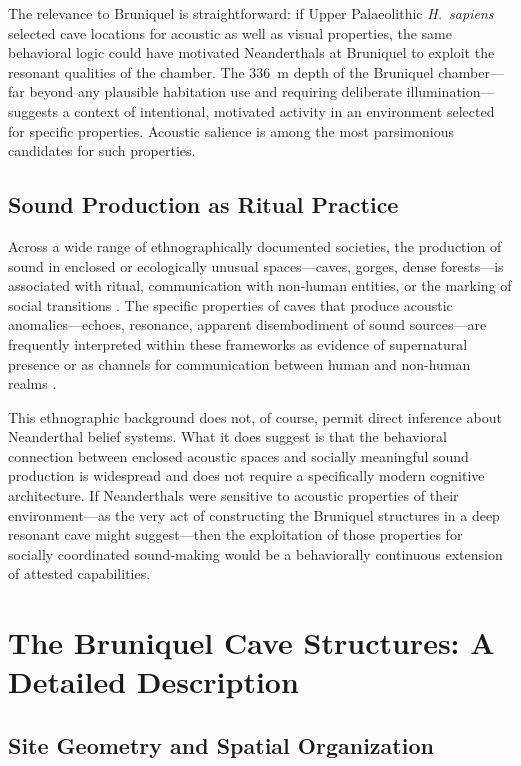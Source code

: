 \documentclass[12pt]{article}
\begin{document}
The relevance to Bruniquel is straightforward: if Upper Palaeolithic \textit{H.\ sapiens} selected cave locations for acoustic as well as visual properties, the same behavioral logic could have motivated Neanderthals at Bruniquel to exploit the resonant qualities of the chamber. The 336~m depth of the Bruniquel chamber—far beyond any plausible habitation use and requiring deliberate illumination—suggests a context of intentional, motivated activity in an environment selected for specific properties. Acoustic salience is among the most parsimonious candidates for such properties.

\subsection{Sound Production as Ritual Practice}

Across a wide range of ethnographically documented societies, the production of sound in enclosed or ecologically unusual spaces—caves, gorges, dense forests—is associated with ritual, communication with non-human entities, or the marking of social transitions \citep{Needham1967, Blacking1973}. The specific properties of caves that produce acoustic anomalies—echoes, resonance, apparent disembodiment of sound sources—are frequently interpreted within these frameworks as evidence of supernatural presence or as channels for communication between human and non-human realms \citep{Waller1993}.

This ethnographic background does not, of course, permit direct inference about Neanderthal belief systems. What it does suggest is that the behavioral connection between enclosed acoustic spaces and socially meaningful sound production is widespread and does not require a specifically modern cognitive architecture. If Neanderthals were sensitive to acoustic properties of their environment—as the very act of constructing the Bruniquel structures in a deep resonant cave might suggest—then the exploitation of those properties for socially coordinated sound-making would be a behaviorally continuous extension of attested capabilities.

\section{The Bruniquel Cave Structures: A Detailed Description}

\subsection{Site Geometry and Spatial Organization}
\end{document}
